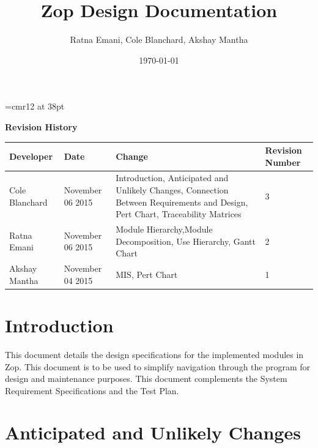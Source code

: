\documentclass[12pt]{article}
\begin{document}
\begin{titlepage}
\font\myfont=cmr12 at 38pt
\title{\myfont\vspace{60mm}Zop Design Documentation} 
\author{Ratna Emani, Cole Blanchard, Akshay Mantha}
\date{\today}
\maketitle

\end{titlepage}
\newpage
\textbf{Revision History}\\
\begin{center}
 \begin{tabular}{|C{3cm}|C{3cm}|C{3cm}|C{3cm}|}
 \hline
 \textbf{Developer} & \textbf{Date} & \textbf{Change} & \textbf{Revision Number}\\
 \hline \hline
 Cole Blanchard & November 06 2015 & Introduction, \newline Anticipated and Unlikely Changes, \newline Connection Between Requirements and Design, \newline Pert Chart, \newline Traceability Matrices & 3\\
 \hline
 Ratna Emani & November 06 2015 & Module Hierarchy,\newline Module Decomposition, \newline Use Hierarchy, \newline Gantt Chart & 2\\
 \hline
 Akshay Mantha & November 04 2015 & MIS, \newline Pert Chart & 1\\
 \hline
 \end{tabular}
\end{center}

\newpage
\tableofcontents
\newpage


\section{Introduction}
This document details the design specifications for the implemented modules in Zop.  This document is to be used to simplify navigation through the program for design and maintenance purposes.  This document complements the System Requirement Specifications and the Test Plan.

\section{Anticipated and Unlikely Changes}\label{SecChange}
\end{document}
